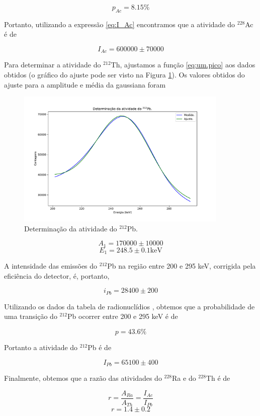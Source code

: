 \documentclass[a4paper, 11pt, notitlepage]{article}
\numberwithin{equation}{section}  %
\begin{document}
\[ p_{Ac} = 8.15 \% \]

Portanto, utilizando a expressão \eqref{eq:I_Ac} encontramos que a atividade do ${}^{228}$Ac é de

\[ I_{Ac} = 600000 \pm 70000 \]

Para determinar a atividade do ${}^{212}$Th, ajustamos a função \eqref{eq:um.pico} aos dados obtidos (o gráfico do ajuste pode ser visto na Figura \ref{fig:atividade.pb}). Os valores obtidos do ajuste para a amplitude e média da gaussiana foram

\begin{figure}[H]
  \centering
  \includegraphics[width=0.9\textwidth]{atividade_pb.pdf}
  \caption{Determinação da atividade do ${}^{212}$Pb.}
  \label{fig:atividade.pb}
\end{figure}

\[ A_1 = 170000 \pm 10000 \]
\[ E_1 = 248.5 \pm 0.1 \text{keV} \]

A intensidade das emissões do ${}^{212}$Pb na região entre 200 e 295 keV, corrigida pela eficiência do detector, é, portanto,

\[i_{Pb} = 28400 \pm 200 \]

Utilizando os dados da tabela de radionuclídios \cite{TabRad_v2}, obtemos que a probabilidade de uma transição do ${}^{212}$Pb ocorrer entre 200 e 295 keV é de

\[ p = 43.6 \% \]

Portanto a atividade do ${}^{212}$Pb é de

\[I_{Pb} = 65100 \pm 400 \]

Finalmente, obtemos que a razão das atividades do ${}^{228}$Ra e do ${}^{228}$Th é de

\[ r = \frac{A_{Ra}}{A_{Th}} = \frac{I_{Ac}}{I_{Pb}} \]
\[ r = 1.4 \pm 0.2 \]
\end{document}
